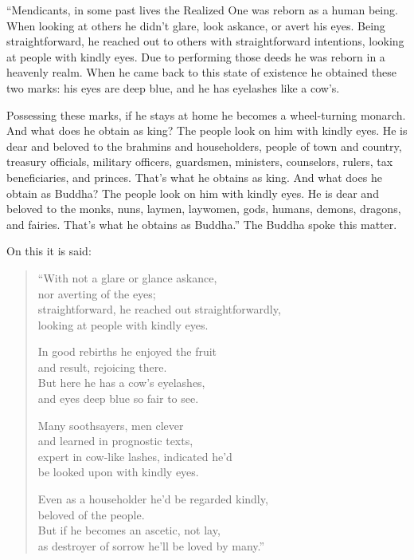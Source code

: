 \documentclass[12pt,openany]{book}%
\begin{document}
“Mendicants, in some past lives the Realized One was reborn as a human being. When looking at others he didn’t glare, look askance, or avert his eyes. Being straightforward, he reached out to others with straightforward intentions, looking at people with kindly eyes. Due to performing those deeds he was reborn in a heavenly realm. When he came back to this state of existence he obtained these two marks: his eyes are deep blue, and he has eyelashes like a cow’s. 

Possessing these marks, if he stays at home he becomes a wheel-turning monarch. And what does he obtain as king? The people look on him with kindly eyes. He is dear and beloved to the brahmins and householders, people of town and country, treasury officials, military officers, guardsmen, ministers, counselors, rulers, tax beneficiaries, and princes. That’s what he obtains as king. And what does he obtain as Buddha? The people look on him with kindly eyes. He is dear and beloved to the monks, nuns, laymen, laywomen, gods, humans, demons, dragons, and fairies. That’s what he obtains as Buddha.” The Buddha spoke this matter. 

On this it is said: 

\begin{verse}%
“With not a glare or glance askance, \\
nor averting of the eyes; \\
straightforward, he reached out straightforwardly, \\
looking at people with kindly eyes. 

In good rebirths he enjoyed the fruit \\
and result, rejoicing there. \\
But here he has a cow’s eyelashes, \\
and eyes deep blue so fair to see. 

Many soothsayers, men clever \\
and learned in prognostic texts, \\
expert in cow-like lashes, indicated he’d \\
be looked upon with kindly eyes. 

Even as a householder he’d be regarded kindly, \\
beloved of the people. \\
But if he becomes an ascetic, not lay, \\
as destroyer of sorrow he’ll be loved by many.” 

%
\end{verse}
\end{document}
